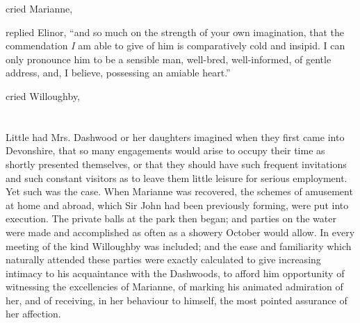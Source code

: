  cried Marianne, 

 replied Elinor, “and so much on the strength of your own imagination, that the commendation {\em I} am able to give of him is comparatively cold and insipid. I can only pronounce him to be a sensible man, well-bred, well-informed, of gentle address, and, I believe, possessing an amiable heart.”

 cried Willoughby, 

\chapter{} %

Little had Mrs. Dashwood or her daughters imagined when they first came into Devonshire, that so many engagements would arise to occupy their time as shortly presented themselves, or that they should have such frequent invitations and such constant visitors as to leave them little leisure for serious employment. Yet such was the case. When Marianne was recovered, the schemes of amusement at home and abroad, which Sir John had been previously forming, were put into execution. The private balls at the park then began; and parties on the water were made and accomplished as often as a showery October would allow. In every meeting of the kind Willoughby was included; and the ease and familiarity which naturally attended these parties were exactly calculated to give increasing intimacy to his acquaintance with the Dashwoods, to afford him opportunity of witnessing the excellencies of Marianne, of marking his animated admiration of her, and of receiving, in her behaviour to himself, the most pointed assurance of her affection.

